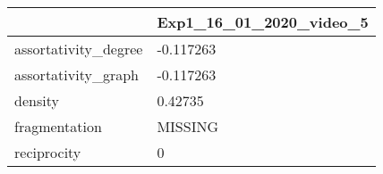 \begin{tabular}{ll}
\toprule
{} & Exp1\_16\_01\_2020\_video\_5 \\
\midrule
assortativity\_degree &               -0.117263 \\
assortativity\_graph  &               -0.117263 \\
density              &                 0.42735 \\
fragmentation        &                 MISSING \\
reciprocity          &                       0 \\
\bottomrule
\end{tabular}
